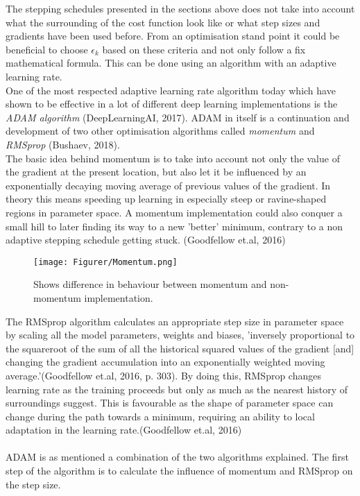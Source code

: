 \documentclass{article}
\begin{document}
\hfill \break

\noindent The stepping schedules presented in the sections above does not take into account what the surrounding of the cost function look like or what step sizes and gradients have been used before. From an optimisation stand point it could be beneficial to choose $\epsilon_k$ based on these criteria and not only follow a fix mathematical formula. This can be done using an algorithm  with an adaptive learning rate.\\

\noindent One of the most respected adaptive learning rate algorithm today which have shown to be effective in a lot of different deep learning implementations is the \textit{ADAM algorithm} (DeepLearningAI, 2017). ADAM in itself is a continuation and development of two other optimisation algorithms called \textit{momentum} and \textit{RMSprop} (Bushaev, 2018).\\

\noindent The basic idea behind momentum is to take into account not only the value of the gradient at the present location, but also let it be influenced by an exponentially decaying moving average of previous values of the gradient. In theory this means speeding up learning in especially steep or ravine-shaped regions in parameter space. A momentum implementation could also conquer a small hill to later finding its way to a new 'better' minimum, contrary to a non adaptive stepping schedule getting stuck. (Goodfellow et.al, 2016)

\begin{figure}[H]
    \centering
    \texttt{[image: Figurer/Momentum.png]}
    \caption{Shows difference in behaviour between momentum and non-momentum implementation.}
    \label{Momentum}
\end{figure}

\noindent The RMSprop algorithm calculates an appropriate step size in parameter space by scaling all the model parameters, weights and biases, 'inversely proportional to the squareroot of the sum of all the historical squared values of the gradient [and] changing the gradient accumulation into an exponentially weighted moving average.'(Goodfellow et.al, 2016, p. 303). By doing this, RMSprop changes learning rate as the training proceeds but only as much as the nearest history of surroundings suggest. This is favourable as the shape of parameter space can change during the path towards a minimum, requiring an ability to local adaptation in the learning rate.(Goodfellow et.al, 2016)\\\\
ADAM is as mentioned a combination of the two algorithms explained. The first step of the algorithm is to calculate the influence of momentum  and RMSprop on the step size. 
\end{document}
